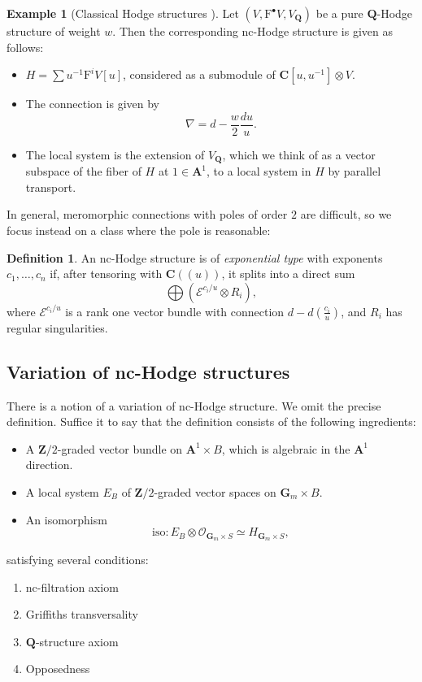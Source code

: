 \documentclass[11pt, reqno]{amsart}
\numberwithin{equation}{section}
\theoremstyle{plain}
\theoremstyle{definition}
\newtheorem{definition}[theorem]{Definition}
\newtheorem{example}[theorem]{Example}
\theoremstyle{italicsname}
\newcommand{\cO}{\mathcal{O}}
\newcommand{\cE}{\mathcal{E}}
\newcommand{\rF}{\mathrm{F}}
\newcommand{\bA}{\mathbf{A}}
\newcommand{\bC}{\mathbf{C}}
\newcommand{\bG}{\mathbf{G}}
\newcommand{\bZ}{\mathbf{Z}}
\newcommand{\bQ}{\mathbf{Q}}
\begin{document}
\begin{example}[Classical Hodge structures ]
    Let $(V, \rF^\bullet V, V_{\bQ})$ be a pure $\bQ$-Hodge structure of weight $w$. Then the corresponding nc-Hodge structure is given as follows:
    \begin{itemize}
        \item $H = \sum u^{-1} \rF^i V[u]$, considered as a submodule of $\bC[u,u^{-1}] \otimes V$.
        \item The connection is given by 
        \[
            \nabla = d - \frac{w}{2} \frac{du}{u}.
        \]
        \item The local system is the extension of $V_{\bQ}$, which we think of as a vector subspace of the fiber of $H$ at $1 \in \bA^1$, to a local system in $H$ by parallel transport.
    \end{itemize}
\end{example}

In general, meromorphic connections with poles of order $2$ are difficult, so we focus instead on a class where the pole is reasonable:

\begin{definition}
\label{def:exponential-type}
    An nc-Hodge structure is of \emph{exponential type} with exponents $c_1, \dots, c_n$ if, after tensoring with $\bC((u))$, it splits into a direct sum  
    \[
        \bigoplus (\cE^{c_i/u} \otimes R_i),
    \]
    where $\cE^{c_i/u}$ is a rank one vector bundle with connection $d - d\left( \frac{c_i}{u} \right)$, and $R_i$ has regular singularities. 
\end{definition}


\subsection*{Variation of nc-Hodge structures}
There is a notion of a variation of nc-Hodge structure. We omit the precise definition. Suffice it to say that the definition consists of the following ingredients:
\begin{itemize}
    \item A $\bZ/2$-graded vector bundle on $\bA^1 \times B$, which is algebraic in the $\bA^1$ direction.
    \item A local system $E_B$ of $\bZ/2$-graded vector spaces on $\bG_m \times B$.
    \item An isomorphism 
    \[
        \mathrm{iso}:E_B \otimes \cO_{\bG_m \times S} \simeq H_{\bG_m \times S},
    \]
\end{itemize}
satisfying several conditions:
\begin{enumerate} [label = (\arabic*)]
    \item nc-filtration axiom
    \item Griffiths transversality
    \item $\bQ$-structure axiom
    \item Opposedness 
\end{enumerate}
\end{document}

